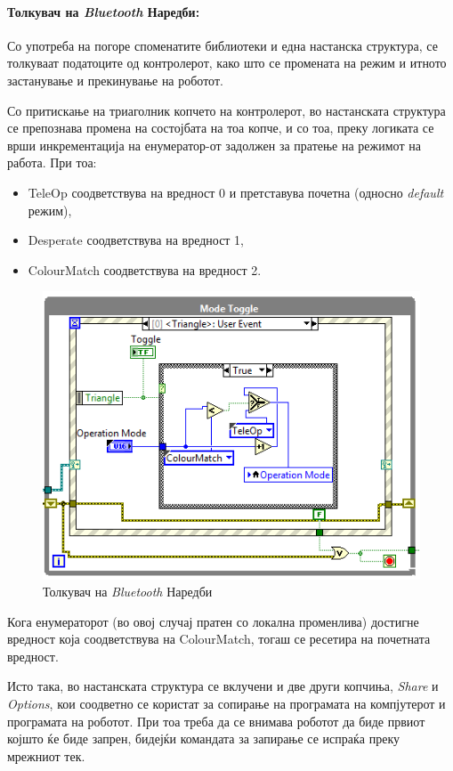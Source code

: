 \documentclass[11pt]{article}
\begin{document}
    \paragraph{Толкувач на \textit{Bluetooth} Наредби:\\}
      Со употреба на погоре споменатите библиотеки и една настанска структура, се толкуваат податоците од контролерот, како што се промената на режим и итното застанување и прекинување на роботот.

      Со притискање на триаголник копчето на контролерот, во настанската структура се препознава промена на состојбата на тоа копче, и со тоа, преку логиката се врши инкрементација на енумератор-от задолжен за пратење на режимот на работа. При тоа:

      \begin{itemize}
        \item TeleOp соодветствува на вредност 0 и претставува почетна (односно \textit{default} режим),
        \item Desperate соодветствува на вредност 1,
        \item ColourMatch соодветствува на вредност 2.
        \end{itemize}

      \begin{figure}[H]
        \centering
        \includegraphics[width=0.75\linewidth]{./images/mode_switch.png}
        \caption{Толкувач на \textit{Bluetooth} Наредби}
        \end{figure}

      Кога енумераторот (во овој случај пратен со локална променлива) достигне вредност која соодветствува на ColourMatch, тогаш се ресетира на почетната вредност.

      Исто така, во настанската структура се вклучени и две други копчиња, \textit{Share} и \textit{Options}, кои соодветно се користат за сопирање на програмата на компјутерот и програмата на роботот. При тоа треба да се внимава роботот да биде првиот којшто ќе биде запрен, бидејќи командата за запирање се испраќа преку мрежниот тек.
\end{document}
